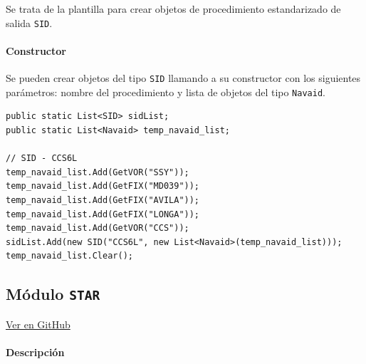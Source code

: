 Se trata de la plantilla para crear objetos de procedimiento estandarizado de salida \texttt{SID}.

\paragraph{Constructor} \phantom{\newline}

Se pueden crear objetos del tipo \texttt{SID} llamando a su constructor con los siguientes parámetros: nombre del procedimiento y lista de objetos del tipo \texttt{Navaid}.

\begin{table}[!hbtp]
	\caption{Ejemplo de instancia al constructor de la clase \texttt{SID}.}
	\label{tab:EjemploSID}
\end{table}
\vspace{-0.8cm}
\begin{scriptsize}
\begin{Verbatim}[frame=single]
public static List<SID> sidList;
public static List<Navaid> temp_navaid_list;

// SID - CCS6L
temp_navaid_list.Add(GetVOR("SSY"));
temp_navaid_list.Add(GetFIX("MD039"));
temp_navaid_list.Add(GetFIX("AVILA"));
temp_navaid_list.Add(GetFIX("LONGA"));
temp_navaid_list.Add(GetVOR("CCS"));
sidList.Add(new SID("CCS6L", new List<Navaid>(temp_navaid_list)));
temp_navaid_list.Clear();
\end{Verbatim}
\end{scriptsize}




\subsection{Módulo \texttt{STAR}}
\label{subsec:ClaseSTAR}

\vspace{-0.85cm}
\begin{flushright}
\href{https://github.com/macgyver912/atc-simulator/blob/jaime/Assets/Scripts/navaids/STAR.cs}{Ver en GitHub \faGithub}
\end{flushright}

\paragraph{Descripción} \phantom{\newline}

